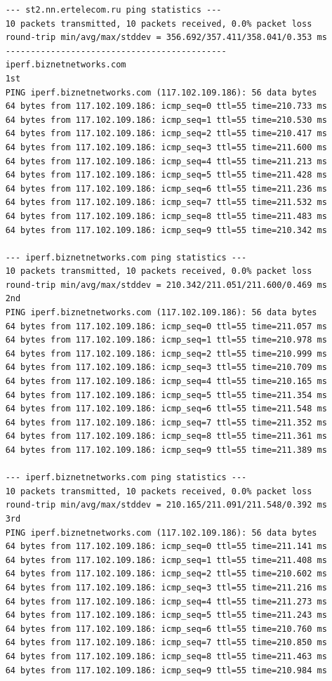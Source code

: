 \documentclass[paper=a4, fontsize=10pt]{scrartcl} %
\numberwithin{equation}{section} %
\numberwithin{figure}{section} %
\numberwithin{table}{section} %
\begin{document}
\begin{lstlisting}
    --- st2.nn.ertelecom.ru ping statistics ---
    10 packets transmitted, 10 packets received, 0.0% packet loss
    round-trip min/avg/max/stddev = 356.692/357.411/358.041/0.353 ms
    --------------------------------------------
    iperf.biznetnetworks.com
    1st
    PING iperf.biznetnetworks.com (117.102.109.186): 56 data bytes
    64 bytes from 117.102.109.186: icmp_seq=0 ttl=55 time=210.733 ms
    64 bytes from 117.102.109.186: icmp_seq=1 ttl=55 time=210.530 ms
    64 bytes from 117.102.109.186: icmp_seq=2 ttl=55 time=210.417 ms
    64 bytes from 117.102.109.186: icmp_seq=3 ttl=55 time=211.600 ms
    64 bytes from 117.102.109.186: icmp_seq=4 ttl=55 time=211.213 ms
    64 bytes from 117.102.109.186: icmp_seq=5 ttl=55 time=211.428 ms
    64 bytes from 117.102.109.186: icmp_seq=6 ttl=55 time=211.236 ms
    64 bytes from 117.102.109.186: icmp_seq=7 ttl=55 time=211.532 ms
    64 bytes from 117.102.109.186: icmp_seq=8 ttl=55 time=211.483 ms
    64 bytes from 117.102.109.186: icmp_seq=9 ttl=55 time=210.342 ms
    
    --- iperf.biznetnetworks.com ping statistics ---
    10 packets transmitted, 10 packets received, 0.0% packet loss
    round-trip min/avg/max/stddev = 210.342/211.051/211.600/0.469 ms
    2nd
    PING iperf.biznetnetworks.com (117.102.109.186): 56 data bytes
    64 bytes from 117.102.109.186: icmp_seq=0 ttl=55 time=211.057 ms
    64 bytes from 117.102.109.186: icmp_seq=1 ttl=55 time=210.978 ms
    64 bytes from 117.102.109.186: icmp_seq=2 ttl=55 time=210.999 ms
    64 bytes from 117.102.109.186: icmp_seq=3 ttl=55 time=210.709 ms
    64 bytes from 117.102.109.186: icmp_seq=4 ttl=55 time=210.165 ms
    64 bytes from 117.102.109.186: icmp_seq=5 ttl=55 time=211.354 ms
    64 bytes from 117.102.109.186: icmp_seq=6 ttl=55 time=211.548 ms
    64 bytes from 117.102.109.186: icmp_seq=7 ttl=55 time=211.352 ms
    64 bytes from 117.102.109.186: icmp_seq=8 ttl=55 time=211.361 ms
    64 bytes from 117.102.109.186: icmp_seq=9 ttl=55 time=211.389 ms
    
    --- iperf.biznetnetworks.com ping statistics ---
    10 packets transmitted, 10 packets received, 0.0% packet loss
    round-trip min/avg/max/stddev = 210.165/211.091/211.548/0.392 ms
    3rd
    PING iperf.biznetnetworks.com (117.102.109.186): 56 data bytes
    64 bytes from 117.102.109.186: icmp_seq=0 ttl=55 time=211.141 ms
    64 bytes from 117.102.109.186: icmp_seq=1 ttl=55 time=211.408 ms
    64 bytes from 117.102.109.186: icmp_seq=2 ttl=55 time=210.602 ms
    64 bytes from 117.102.109.186: icmp_seq=3 ttl=55 time=211.216 ms
    64 bytes from 117.102.109.186: icmp_seq=4 ttl=55 time=211.273 ms
    64 bytes from 117.102.109.186: icmp_seq=5 ttl=55 time=211.243 ms
    64 bytes from 117.102.109.186: icmp_seq=6 ttl=55 time=210.760 ms
    64 bytes from 117.102.109.186: icmp_seq=7 ttl=55 time=210.850 ms
    64 bytes from 117.102.109.186: icmp_seq=8 ttl=55 time=211.463 ms
    64 bytes from 117.102.109.186: icmp_seq=9 ttl=55 time=210.984 ms
    

\end{lstlisting}
\end{document}
